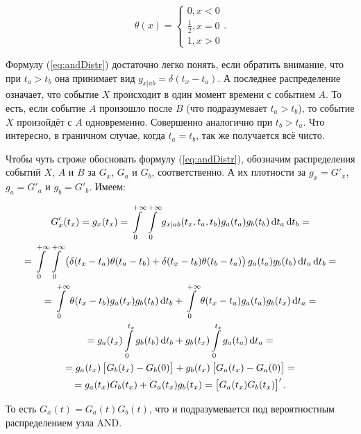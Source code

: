 \documentclass[a4paper, 12pt]{article}
\begin{document}
\begin{equation*}
  \theta(x) = \left\{
    \begin{array}{l}
      0, x < 0 \\
      \frac 1 2, x = 0 \\
      1, x > 0
    \end{array}
    \right. .
\end{equation*}

Формулу (\ref{eq:andDistr}) достаточно легко понять, если обратить внимание, что при $t_a > t_b$ она принимает вид $g_{x|ab} = \delta(t_x - t_a)$. А последнее распределение означает, что событие $X$ происходит в один момент времени с событием $A$. То есть, если событие $A$ произошло после $B$ (что подразумевает $t_a > t_b$), то событие $X$ произойдёт с $A$ одновременно. Совершенно аналогично при $t_b > t_a$. Что интересно, в граничном случае, когда $t_a = t_b$, так же получается всё чисто.

Чтобы чуть строже обосновать формулу (\ref{eq:andDistr}), обозначим распределения событий $X$, $A$ и $B$ за $G_x$, $G_a$ и $G_b$, соответственно. А их плотности за $g_x = G'_x$, $g_a = G'_a$ и $g_b = G'_b$. Имеем:

\begin{equation}
  \label{eq:andProve}
  \begin{gathered}
    G_x'(t_x) = g_x(t_x) = \int\limits_0^{+\infty} \int\limits_0^{+\infty}
    g_{x|ab}(t_x, t_a, t_b) g_a(t_a) g_b(t_b) \dif t_a \dif t_b = \\
    = \int\limits_0^{+\infty} \int\limits_0^{+\infty}
    \left(\delta(t_x - t_a) \theta(t_a - t_b) + \delta(t_x - t_b) \theta(t_b - t_a)\right)
    g_a(t_a) g_b(t_b) \dif t_a \dif t_b = \\
    = \int\limits_0^{+\infty} \theta(t_x - t_b) g_a(t_x) g_b(t_b) \dif t_b +
    \int\limits_0^{+\infty} \theta(t_x - t_a) g_a(t_a) g_b(t_x) \dif t_a = \\
    = g_a(t_x) \int\limits_0^{t_x} g_b(t_b) \dif t_b +
    g_b(t_x) \int\limits_0^{t_x} g_a(t_a) \dif t_a = \\
    = g_a(t_x) \left[G_b(t_x) - G_b(0)\right] +
    g_b(t_x) \left[G_a(t_x) - G_a(0)\right] = \\
    = g_a(t_x) G_b(t_x) + G_a(t_x) g_b(t_x) = \left[ G_a(t_x) G_b(t_x) \right]'.
  \end{gathered}
\end{equation}

То есть $G_x(t) = G_a(t) G_b(t)$, что и подразумевается под вероятностным распределением узла AND.
\end{document}
